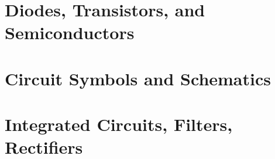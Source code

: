 \documentclass[12pt]{book}
\begin{document}
\section{Diodes, Transistors, and Semiconductors}


\section{Circuit Symbols and Schematics}

\section{Integrated Circuits, Filters, Rectifiers}


% 
% 
% 
% 
% 
\end{document}
